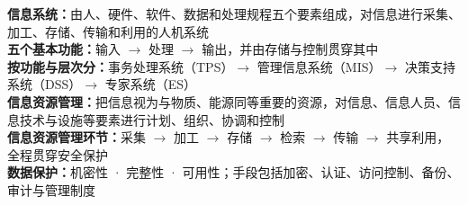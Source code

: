 \documentclass[a4paper,11pt]{article}
\begin{document}

\begin{knowmap}
\textbf{信息系统：}由人、硬件、软件、数据和处理规程五个要素组成，对信息进行采集、加工、存储、传输和利用的人机系统\\[2pt]
\textbf{五个基本功能：}输入 $\rightarrow$ 处理 $\rightarrow$ 输出，并由存储与控制贯穿其中\\[2pt]
\textbf{按功能与层次分：}事务处理系统（TPS）$\rightarrow$ 管理信息系统（MIS）$\rightarrow$ 决策支持系统（DSS）$\rightarrow$ 专家系统（ES）\\[2pt]
\textbf{信息资源管理：}把信息视为与物质、能源同等重要的资源，对信息、信息人员、信息技术与设施等要素进行计划、组织、协调和控制\\[2pt]
\textbf{信息资源管理环节：}采集 $\rightarrow$ 加工 $\rightarrow$ 存储 $\rightarrow$ 检索 $\rightarrow$ 传输 $\rightarrow$ 共享利用，全程贯穿安全保护\\[2pt]
\textbf{数据保护：}机密性 · 完整性 · 可用性；手段包括加密、认证、访问控制、备份、审计与管理制度
\end{knowmap}
\end{document}
